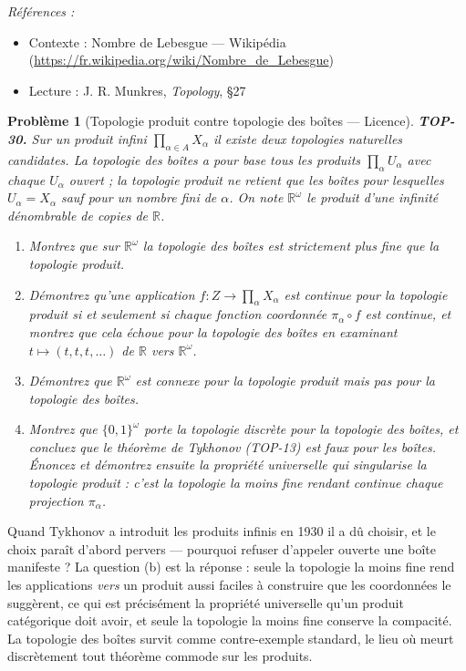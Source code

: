 \documentclass[11pt]{article}
\newtheorem{problem}{Problème}
\newenvironment{refs}{\par\small\noindent\emph{Références :}\begin{itemize}\setlength\itemsep{0pt}}{\end{itemize}\normalsize}
\begin{document}
\begin{refs}
\item Contexte : Nombre de Lebesgue --- Wikipédia (\url{https://fr.wikipedia.org/wiki/Nombre_de_Lebesgue})
\item Lecture : J. R. Munkres, \textit{Topology}, \S{}27
\end{refs}

\bigskip

\begin{problem}[{Topologie produit contre topologie des boîtes --- Licence}]
\textbf{TOP-30.} Sur un produit infini $ \prod_{\alpha \in A} X_\alpha $ il existe deux topologies
naturelles candidates. La topologie \textit{des boîtes} a pour base tous les produits
$ \prod_\alpha U_\alpha $ avec chaque $ U_\alpha $ ouvert ; la topologie \textit{produit} ne retient
que les boîtes pour lesquelles $ U_\alpha = X_\alpha $ sauf pour un nombre fini de $ \alpha $. On
note $ \mathbb{R}^\omega $ le produit d'une infinité dénombrable de copies de $\mathbb{R}$.
\begin{enumerate}
\item[(a)] Montrez que sur $ \mathbb{R}^\omega $ la topologie des boîtes est strictement plus fine que la
topologie produit.
\item[(b)] Démontrez qu'une application $ f : Z \to \prod_\alpha X_\alpha $ est continue pour la topologie
produit si et seulement si chaque fonction coordonnée $ \pi_\alpha \circ f $ est continue, et montrez
que cela échoue pour la topologie des boîtes en examinant $ t \mapsto (t, t, t, \ldots) $ de $\mathbb{R}$ vers
$ \mathbb{R}^\omega $.
\item[(c)] Démontrez que $ \mathbb{R}^\omega $ est connexe pour la topologie produit mais pas pour la
topologie des boîtes.
\item[(d)] Montrez que $ \{0,1\}^\omega $ porte la topologie discrète pour la topologie des boîtes, et
concluez que le théorème de Tykhonov (TOP-13) est faux pour les boîtes. Énoncez et démontrez ensuite la
propriété universelle qui singularise la topologie produit : c'est la topologie la moins fine rendant
continue chaque projection $ \pi_\alpha $.
\end{enumerate}

\end{problem}

\noindent Quand Tykhonov a introduit les produits infinis en 1930 il a dû choisir, et le choix
paraît d'abord pervers --- pourquoi refuser d'appeler ouverte une boîte manifeste ? La question (b) est la
réponse : seule la topologie la moins fine rend les applications \textit{vers} un produit aussi faciles à
construire que les coordonnées le suggèrent, ce qui est précisément la propriété universelle qu'un produit
catégorique doit avoir, et seule la topologie la moins fine conserve la compacité. La topologie des boîtes
survit comme contre-exemple standard, le lieu où meurt discrètement tout théorème commode sur les
produits.
\end{document}
